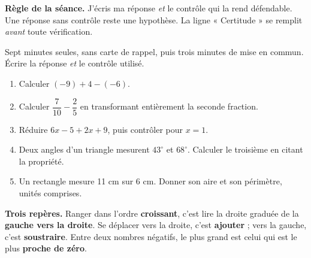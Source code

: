 \documentclass[10pt,a4paper]{article}
\begin{document}
\begin{graybox}\small\textbf{Règle de la séance.} J'écris ma réponse \emph{et} le contrôle qui la rend défendable. Une réponse sans contrôle reste une hypothèse. La ligne « Certitude » se remplit \emph{avant} toute vérification.\end{graybox}
\par\vspace{2mm}
Sept minutes seules, sans carte de rappel, puis trois minutes de mise en commun. Écrire la réponse \emph{et} le contrôle utilisé.
\begin{enumerate}
\item Calculer $(-9) + 4 - (-6)$.
\item Calculer $\dfrac{7}{10} - \dfrac{2}{5}$ en transformant entièrement la seconde fraction.
\item Réduire $6x - 5 + 2x + 9$, puis contrôler pour $x = 1$.
\item Deux angles d'un triangle mesurent $43^\circ$ et $68^\circ$. Calculer le troisième en citant la propriété.
\item Un rectangle mesure 11 cm sur 6 cm. Donner son aire et son périmètre, unités comprises.
\end{enumerate}
\certline
\aideline
\needspace{62mm}\par\vspace{3mm}
\begin{methodbox}
\textbf{Trois repères.} Ranger dans l'ordre \textbf{croissant}, c'est lire la droite graduée de la \textbf{gauche vers la droite}.
Se déplacer vers la droite, c'est \textbf{ajouter} ; vers la gauche, c'est \textbf{soustraire}.
Entre deux nombres négatifs, le plus grand est celui qui est le plus \textbf{proche de zéro}.
\end{methodbox}
\begin{center}
\end{center}
\end{document}
